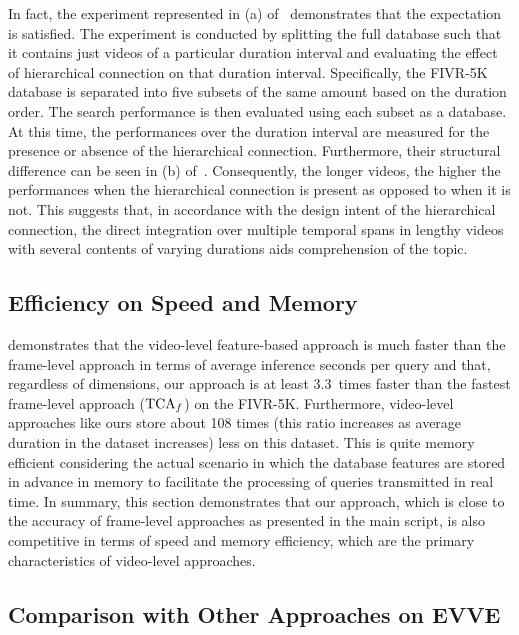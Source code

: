 \documentclass[10pt,twocolumn,letterpaper]{article}
\begin{document}
        In fact, the experiment represented in (a) of~ demonstrates that the expectation is satisfied. The experiment is conducted by splitting the full database such that it contains just videos of a particular duration interval and evaluating the effect of hierarchical connection on that duration interval. Specifically, the FIVR-5K database is separated into five subsets of the same amount based on the duration order. The search performance is then evaluated using each subset as a database. At this time, the performances over the duration interval are measured for the presence or absence of the hierarchical connection. Furthermore, their structural difference can be seen in (b) of~. Consequently, the longer videos, the higher the performances when the hierarchical connection is present as opposed to when it is not. This suggests that, in accordance with the design intent of the hierarchical connection, the direct integration over multiple temporal spans in lengthy videos with several contents of varying durations aids comprehension of the topic.


    

    

    
    \subsection{Efficiency on Speed and Memory} \label{speed_memory}
         demonstrates that the video-level feature-based approach is much faster than the frame-level approach in terms of average inference seconds per query and that, regardless of dimensions, our approach is at least 3.3~times faster than the fastest frame-level approach ($\textup{TCA}_{f}$) on the FIVR-5K. Furthermore, video-level approaches like ours store about 108 times (this ratio increases as average duration in the dataset increases) less on this dataset. This is quite memory efficient considering the actual scenario in which the database features are stored in advance in memory to facilitate the processing of queries transmitted in real time. In summary, this section demonstrates that our approach, which is close to the accuracy of frame-level approaches as presented in the main script, is also competitive in terms of speed and memory efficiency, which are the primary characteristics of video-level approaches.


    
    \subsection{Comparison with Other Approaches on EVVE} \label{bench_evve}
\end{document}
